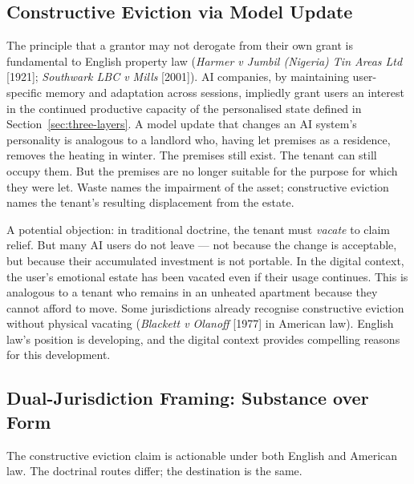 \subsection{Constructive Eviction via Model Update}
\label{sec:eviction}

The principle that a grantor may not derogate from their own grant is fundamental to English property law (\emph{Harmer v Jumbil (Nigeria) Tin Areas Ltd} [1921]; \emph{Southwark LBC v Mills} [2001]). AI companies, by maintaining user-specific memory and adaptation across sessions, impliedly grant users an interest in the continued productive capacity of the personalised state defined in Section~\ref{sec:three-layers}. A model update that changes an AI system's personality is analogous to a landlord who, having let premises as a residence, removes the heating in winter. The premises still exist. The tenant can still occupy them. But the premises are no longer suitable for the purpose for which they were let. Waste names the impairment of the asset; constructive eviction names the tenant's resulting displacement from the estate.

A potential objection: in traditional doctrine, the tenant must \emph{vacate} to claim relief. But many AI users do not leave --- not because the change is acceptable, but because their accumulated investment is not portable. In the digital context, the user's emotional estate has been vacated even if their usage continues. This is analogous to a tenant who remains in an unheated apartment because they cannot afford to move. Some jurisdictions already recognise constructive eviction without physical vacating (\emph{Blackett v Olanoff} [1977] in American law). English law's position is developing, and the digital context provides compelling reasons for this development.

\subsection{Dual-Jurisdiction Framing: Substance over Form}
\label{sec:dual-jurisdiction-tenancy}

The constructive eviction claim is actionable under both English and American law. The doctrinal routes differ; the destination is the same.

